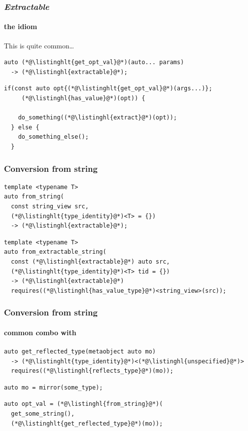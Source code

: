 \documentclass[compress,table,xcolor=table]{beamer}
\begin{document}
\begin{frame}[fragile]
  \frametitle{\em Extractable}
  \framesubtitle{the idiom}
  This is quite common\ldots
  \begin{lstlisting}[language=c++2x,basicstyle=\normalsize\ttfamily]
  auto (*@\listinghlt{get_opt_val}@*)(auto... params)
  -> (*@\listinghl{extractable}@*);
  \end{lstlisting}
  \vfill
  \begin{lstlisting}[language=c++2x,basicstyle=\normalsize\ttfamily]
  if(const auto opt{(*@\listinghlt{get_opt_val}@*)(args...)};
     (*@\listinghl{has_value}@*)(opt)) {

    do_something((*@\listinghl{extract}@*)(opt));
  } else {
    do_something_else();
  }
  \end{lstlisting}
\end{frame}
\begin{frame}[fragile]
  \frametitle{Conversion from string}
  \begin{lstlisting}[language=c++2x,basicstyle=\normalsize\ttfamily]
template <typename T>
auto from_string(
  const string_view src,
  (*@\listinghlt{type_identity}@*)<T> = {})
  -> (*@\listinghl{extractable}@*);
  \end{lstlisting}
  \vfill
  \begin{lstlisting}[language=c++2x,basicstyle=\normalsize\ttfamily]
template <typename T>
auto from_extractable_string(
  const (*@\listinghl{extractable}@*) auto src,
  (*@\listinghlt{type_identity}@*)<T> tid = {})
  -> (*@\listinghl{extractable}@*)
  requires((*@\listinghl{has_value_type}@*)<string_view>(src));
  \end{lstlisting}
\end{frame}
\begin{frame}[fragile]
  \frametitle{Conversion from string}
  \framesubtitle{common combo with }
  \begin{lstlisting}[language=c++2x,basicstyle=\normalsize\ttfamily]
auto get_reflected_type(metaobject auto mo)
  -> (*@\listinghlt{type_identity}@*)<(*@\listinghl{unspecified}@*)>
  requires((*@\listinghl{reflects_type}@*)(mo));
  \end{lstlisting}
  \vfill
  \begin{lstlisting}[language=c++2x,basicstyle=\normalsize\ttfamily]
auto mo = mirror(some_type);
  \end{lstlisting}
  \begin{lstlisting}[language=c++2x,basicstyle=\normalsize\ttfamily]
auto opt_val = (*@\listinghl{from_string}@*)(
  get_some_string(),
  (*@\listinghlt{get_reflected_type}@*)(mo));
  \end{lstlisting}
\end{frame}
\end{document}
